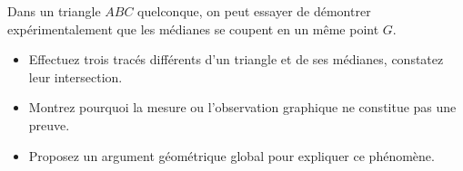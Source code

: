 Dans un triangle $ABC$ quelconque, on peut essayer de démontrer
expérimentalement que les médianes se coupent en un même point $G$.
\begin{itemize}
  \item Effectuez trois tracés différents d'un triangle et de ses médianes,
  constatez leur intersection.
  \item Montrez pourquoi la mesure ou l'observation graphique ne constitue pas
  une preuve.
  \item Proposez un argument géométrique global pour expliquer ce phénomène.
\end{itemize}
